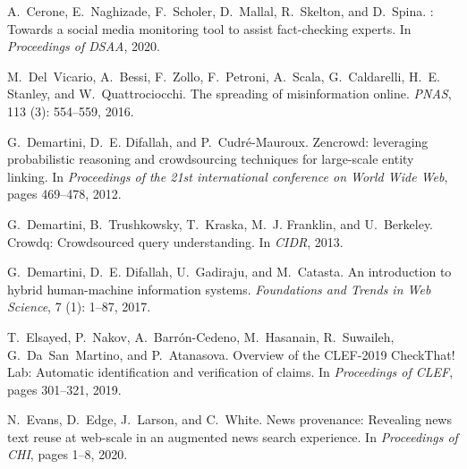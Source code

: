 \documentclass[11pt]{article}
\begin{document}
\begin{thebibliography}{10}
\begin{small}
A.~Cerone, E.~Naghizade, F.~Scholer, D.~Mallal, R.~Skelton, and D.~Spina.
: Towards a social media monitoring tool to assist
fact-checking experts.
\newblock In \emph{Proceedings of DSAA}, 2020.

M.~Del~Vicario, A.~Bessi, F.~Zollo, F.~Petroni, A.~Scala, G.~Caldarelli, H.~E.
Stanley, and W.~Quattrociocchi.
\newblock The spreading of misinformation online.
\newblock \emph{PNAS}, 113 (3): 554--559, 2016.

G.~Demartini, D.~E. Difallah, and P.~Cudr{\'e}-Mauroux.
\newblock Zencrowd: leveraging probabilistic reasoning and crowdsourcing
techniques for large-scale entity linking.
\newblock In \emph{Proceedings of the 21st international conference on World
	Wide Web}, pages 469--478, 2012.

G.~Demartini, B.~Trushkowsky, T.~Kraska, M.~J. Franklin, and U.~Berkeley.
\newblock Crowdq: Crowdsourced query understanding.
\newblock In \emph{CIDR}, 2013.

G.~Demartini, D.~E. Difallah, U.~Gadiraju, and M.~Catasta.
\newblock An introduction to hybrid human-machine information systems.
\newblock \emph{Foundations and Trends in Web Science}, 7
(1): 1--87, 2017.

T.~Elsayed, P.~Nakov, A.~Barr{\'o}n-Cedeno, M.~Hasanain, R.~Suwaileh,
G.~Da~San~Martino, and P.~Atanasova.
\newblock Overview of the {CLEF-2019 CheckThat! Lab}: Automatic identification
and verification of claims.
\newblock In \emph{Proceedings of CLEF}, pages 301--321, 2019.

N.~Evans, D.~Edge, J.~Larson, and C.~White.
\newblock News provenance: Revealing news text reuse at web-scale in an
augmented news search experience.
\newblock In \emph{Proceedings of CHI}, pages 1--8, 2020.


\end{small}
\end{thebibliography}
\end{document}
